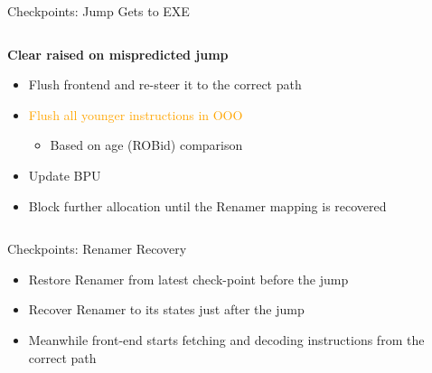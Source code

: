 \documentclass[aspectratio=169,12pt]{beamer}
\begin{document}
\begin{frame}{Checkpoints: Jump Gets to EXE}
    \centering
    
    
    \vspace{0.5cm}
    \begin{columns}[T]
        \begin{column}{0.9\textwidth}
            \textbf{Clear raised on mispredicted jump}
            \begin{itemize}
                \item Flush frontend and re-steer it to the correct path
                \item \textcolor{orange}{Flush all younger instructions in OOO}
                \begin{itemize}
                    \item Based on age (ROBid) comparison
                \end{itemize}
                \item Update BPU
                \item Block further allocation until the Renamer mapping is recovered
            \end{itemize}
        \end{column}
    \end{columns}
\end{frame}

\begin{frame}{Checkpoints: Renamer Recovery}
    \centering

    
    \begin{itemize}
        \item Restore Renamer from latest check-point before the jump
        \item Recover Renamer to its states just after the jump
        \item Meanwhile front-end starts fetching and decoding instructions from the correct path
    \end{itemize}
\end{frame}
\end{document}
